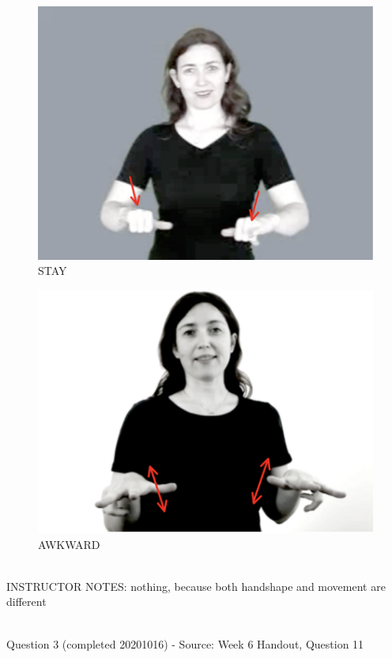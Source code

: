 \documentclass[12pt]{article}
\begin{document}
\begin{figure}[H]
\includegraphics{../images/asl_stay.png}
\caption{STAY}
\end{figure}
\begin{figure}[H]
\includegraphics{../images/asl_awkward.png}
\caption{AWKWARD}
\end{figure}

~\\
INSTRUCTOR NOTES: nothing, because both handshape and movement are different


~\\

{\large Question 3} (completed 20201016) - Source: Week 6 Handout, Question 11\\
\end{document}
